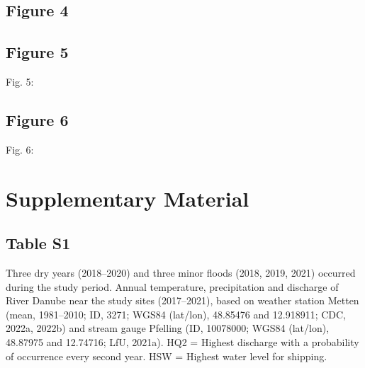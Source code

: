 \documentclass[
]{article}
\begin{document}
\hypertarget{figure-4}{%
\subsection*{Figure 4}\label{figure-4}}

\clearpage

\newpage

\hypertarget{figure-5}{%
\subsection*{Figure 5}\label{figure-5}}

Fig. 5:

\clearpage

\newpage

\hypertarget{figure-6}{%
\subsection*{Figure 6}\label{figure-6}}

Fig. 6:

\clearpage

\newpage

\hypertarget{supplementary-material}{%
\section*{Supplementary Material}\label{supplementary-material}}

\hypertarget{table-s1}{%
\subsection*{Table S1}\label{table-s1}}

Three dry years (2018--2020) and three minor floods (2018, 2019, 2021) occurred during the study period. Annual temperature, precipitation and discharge of River Danube near the study sites (2017--2021), based on weather station Metten (mean, 1981--2010; ID, 3271; WGS84 (lat/lon), 48.85476 and 12.918911; CDC, 2022a, 2022b) and stream gauge Pfelling (ID, 10078000; WGS84 (lat/lon), 48.87975 and 12.74716; LfU, 2021a). HQ2 = Highest discharge with a probability of occurrence every second year. HSW = Highest water level for shipping.

\clearpage
\end{document}
